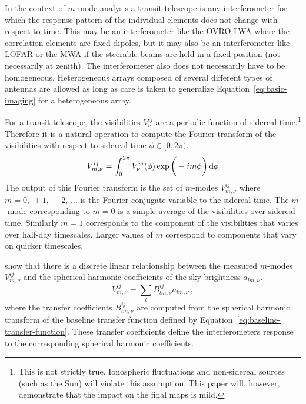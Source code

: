 \documentclass[twocolumn]{aastex61}
\renewcommand{\d}{{\rm d}}
\begin{document}
In the context of $m$-mode analysis a transit telescope is any interferometer for which the response
pattern of the individual elements does not change with respect to time. This may be an
interferometer like the OVRO-LWA where the correlation elements are fixed dipoles, but it may also
be an interferometer like LOFAR or the MWA if the steerable beams are held in a fixed position (not
necessarily at zenith). The interferometer also does not necessarily have to be homogeneous.
Heterogeneous arrays composed of several different types of antennas are allowed as long as care is
taken to generalize Equation~\ref{eq:basic-imaging} for a heterogeneous array.

For a transit telescope, the visibilities $V^{ij}_\nu$ are a periodic function of sidereal
time.\footnote{
    This is not strictly true. Ionospheric fluctuations and non-sidereal sources (such as the Sun)
    will violate this assumption. This paper will, however, demonstrate that the impact on the final
    maps is mild.
}
Therefore it is a natural operation to compute the Fourier transform of the visibilities with
respect to sidereal time $\phi\in[0,2\pi)$.
\begin{equation}
    V^{ij}_{m,\nu} = \int_0^{2\pi} V^{ij}_\nu(\phi)\exp\bigg(-im\phi\bigg)\,\d\phi
\end{equation}
The output of this Fourier transform is the set of $m$-modes $V^{ij}_{m,\nu}$ where
$m=0,\,\pm1,\,\pm2,\,\ldots$ is the Fourier conjugate variable to the sidereal time. The $m$-mode
corresponding to $m=0$ is a simple average of the visibilities over sidereal time. Similarly $m=1$
corresponds to the component of the visibilities that varies over half-day timescales. Larger values
of $m$ correspond to components that vary on quicker timescales.

\citet{2014ApJ...781...57S, 2015PhRvD..91h3514S} show that there is a discrete linear relationship
between the measured $m$-modes $V^{ij}_{m,\nu}$ and the spherical harmonic coefficients of the sky
brightness $a_{lm,\nu}$.
\begin{equation}\label{eq:m-mode-sum-equation}
    V^{ij}_{m,\nu} = \sum_l B^{ij}_{lm,\nu} a_{lm,\nu}\,,
\end{equation}
where the transfer coefficients $B^{ij}_{lm,\nu}$ are computed from the spherical harmonic transform
of the baseline transfer function defined by Equation~\ref{eq:baseline-transfer-function}. These
transfer coefficients define the interferometers response to the corresponding spherical harmonic
coefficients.
\end{document}

